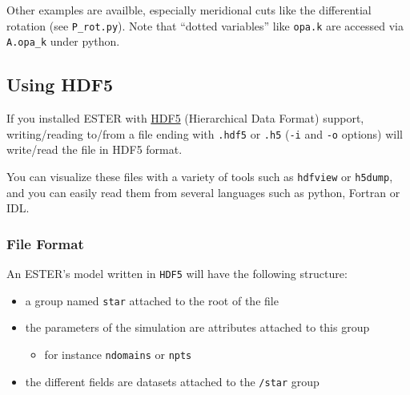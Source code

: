 Other examples are availble, especially meridional cuts like the
differential rotation (see \texttt{P\_rot.py}). Note that ``dotted
variables'' like \verb|opa.k| are accessed via \verb|A.opa_k| under
python.

\subsection{Using HDF5}
If you installed ESTER with
\href{http://www.hdfgroup.org/HDF5/whatishdf5.html}{HDF5} (Hierarchical Data
Format) support, writing/reading to/from a file ending with \texttt{.hdf5} or
\texttt{.h5} (\texttt{-i} and \texttt{-o} options) will write/read the file in
HDF5 format.  

You can visualize these files with a variety of tools such as \texttt{hdfview}
or \texttt{h5dump}, and you can easily read them from several languages such as
python, Fortran or IDL.

\subsubsection{File Format}
An ESTER's model written in \texttt{HDF5} will have the following structure: 
\begin{itemize}
    \item a group named \texttt{star} attached to the root of the file
    \item the parameters of the simulation are attributes attached to this group
        \begin{itemize}
            \item for instance \texttt{ndomains} or \texttt{npts}
        \end{itemize}
    \item the different fields are datasets attached to the \texttt{/star} group
\end{itemize}

